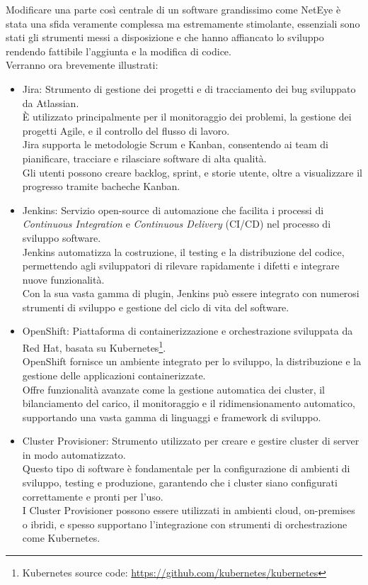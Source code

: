 Modificare una parte così centrale di un software grandissimo come NetEye è stata
una sfida veramente complessa ma estremamente stimolante, essenziali sono stati
gli strumenti messi a disposizione e che hanno affiancato lo sviluppo rendendo
fattibile l'aggiunta e la modifica di codice.\\ Verranno ora brevemente
illustrati:
\begin{itemize}
  \item Jira: Strumento di gestione dei progetti e di tracciamento dei bug
    sviluppato da Atlassian.\\ È utilizzato principalmente per il monitoraggio
    dei problemi, la gestione dei progetti Agile, e il controllo del flusso di
    lavoro.\\ Jira supporta le metodologie Scrum e Kanban, consentendo ai team di
    pianificare, tracciare e rilasciare software di alta qualità.\\ Gli utenti
    possono creare backlog, sprint, e storie utente, oltre a visualizzare il progresso
    tramite bacheche Kanban.

  \item Jenkins: Servizio open-source di automazione che facilita i processi di
    \textit{Continuous Integration} e \textit{Continuous Delivery} (CI/CD) nel
    processo di sviluppo software.\\ Jenkins automatizza la costruzione, il testing
    e la distribuzione del codice, permettendo agli sviluppatori di rilevare
    rapidamente i difetti e integrare nuove funzionalità.\\ Con la sua vasta
    gamma di plugin, Jenkins può essere integrato con numerosi strumenti di sviluppo
    e gestione del ciclo di vita del software.

  \item OpenShift: Piattaforma di containerizzazione e orchestrazione sviluppata
    da Red Hat, basata su Kubernetes\footnote{\label{kubernetes_note}Kubernetes source
    code: \url{https://github.com/kubernetes/kubernetes}}.\\ OpenShift fornisce
    un ambiente integrato per lo sviluppo, la distribuzione e la gestione delle applicazioni
    containerizzate.\\ Offre funzionalità avanzate come la gestione automatica dei
    cluster, il bilanciamento del carico, il monitoraggio e il ridimensionamento
    automatico, supportando una vasta gamma di linguaggi e framework di sviluppo.

  \item Cluster Provisioner: Strumento utilizzato per creare e gestire cluster
    di server in modo automatizzato.\\ Questo tipo di software è fondamentale
    per la configurazione di ambienti di sviluppo, testing e produzione,
    garantendo che i cluster siano configurati correttamente e pronti per l'uso.\\
    I Cluster Provisioner possono essere utilizzati in ambienti cloud, on-premises
    o ibridi, e spesso supportano l'integrazione con strumenti di orchestrazione
    come Kubernetes.


\end{itemize}

